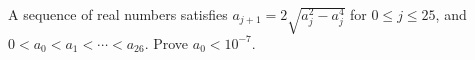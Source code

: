 A sequence of real numbers satisfies $a_{j+1}=2\sqrt{a_j^2-a_j^4}$ for $0\le j\le25$, and $0<a_0<a_1<\cdots<a_{26}$. Prove $a_0<10^{-7}$.
